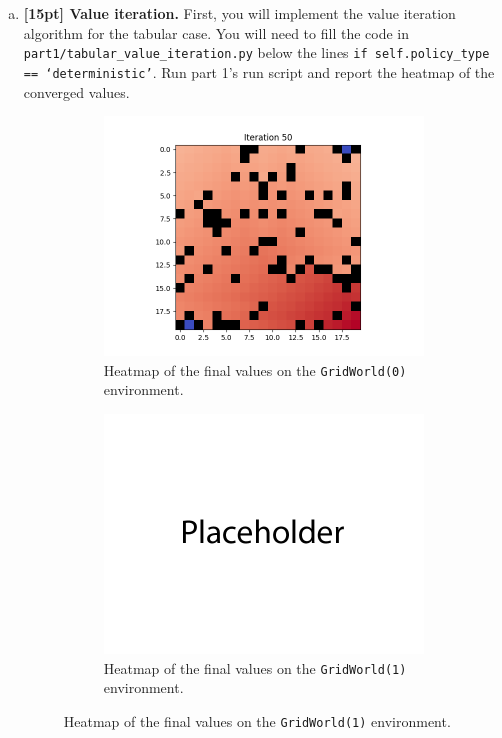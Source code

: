 \documentclass{article}
\begin{document}
\begin{enumerate}[(a)]

\item {\bf [15pt] Value iteration.} First, you will implement the value iteration algorithm for the tabular case. You will need to fill the code in \texttt{part1/tabular\_value\_iteration.py} below the lines \texttt{if self.policy\_type == `deterministic'}. Run part 1's run script and report the heatmap of the converged values.

\begin{figure}[h!]
    \centering
    \begin{subfigure}{0.45\textwidth}
        \centering
        \includegraphics[width=\textwidth]{figures/part_1_a.png}
        \caption{Heatmap of the final values on the \texttt{GridWorld(0)} environment.}
    \end{subfigure}
    \hspace{0.2in}
    \begin{subfigure}{0.45\textwidth}
        \centering
        \includegraphics[width=\textwidth]{figures/placeholder.png}
        \caption{Heatmap of the final values on the \texttt{GridWorld(1)} environment.}
    \end{subfigure}
\end{figure}


\end{enumerate}
\end{document}
